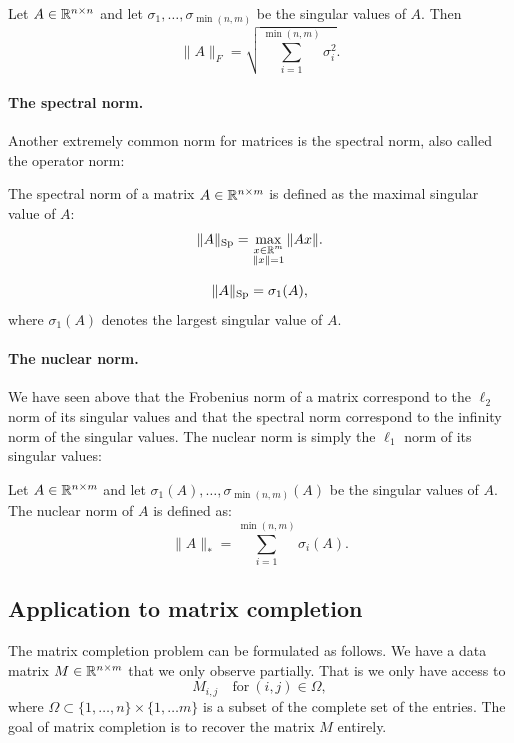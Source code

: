\documentclass[11pt,nocut]{article}
\begin{document}
\begin{proposition}
	Let $A \in \mathbb{R}^{n \times n}$ and let $\sigma_1, \dots, \sigma_{\min(n,m)}$ be the singular values of $A$. Then
	$$
	\|A\|_F = \sqrt{\sum_{i=1}^{\min(n,m)} \sigma_i^2}.
	$$
\end{proposition}


\paragraph{The spectral norm.} Another extremely common norm for matrices is the spectral norm, also called the operator norm:

\begin{definition}
	The spectral norm of a matrix $A \in \mathbb{R}^{n \times m}$ is defined as the maximal singular value of $A$:
	$$
	\|A\|_{\rm Sp} = \max_{\substack{x \in \mathbb{R}^m \\ \|x\|=1}} \|Ax\|.
	$$
\end{definition}
\begin{proposition}
	$$
	\|A\|_{\rm Sp} = \sigma_1(A),
	$$
	where $\sigma_1(A)$ denotes the largest singular value of $A$.
\end{proposition}

\paragraph{The nuclear norm.} We have seen above that the Frobenius norm of a matrix correspond to the $\ell_2$ norm of its singular values and that the spectral norm correspond to the infinity norm of the singular values. The nuclear norm is simply the $\ell_1$ norm of its singular values:
\begin{definition}
	Let $A \in \mathbb{R}^{n \times m}$ and let $\sigma_1(A), \dots, \sigma_{\min(n,m)}(A)$ be the singular values of $A$. The nuclear norm of $A$ is defined as:
	$$
	\|A\|_* = \sum_{i=1}^{\min(n,m)} \sigma_i(A).
	$$
	
\end{definition}

\subsection{Application to matrix completion}

The matrix completion problem can be formulated as follows.
We have a data matrix $M \in \mathbb{R}^{n \times m}$ that we only observe partially. That is we only have access to 
$$
M_{i,j} \quad \text{for} \ (i,j) \in \Omega,
$$
where $\Omega \subset \{1, \dots, n\} \times \{1, \dots m\}$ is a subset of the complete set of the entries.
The goal of matrix completion is to recover the matrix $M$ entirely.
\\
\end{document}
